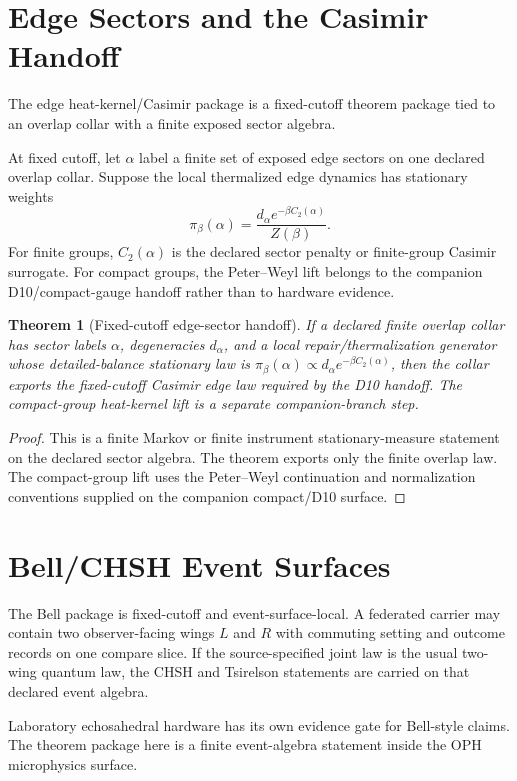 \documentclass[11pt]{article}
\newtheorem{theorem}{Theorem}[section]
\theoremstyle{remark}
\theoremstyle{plain}
\begin{document}
\section{Edge Sectors and the Casimir Handoff}

The edge heat-kernel/Casimir package is a fixed-cutoff theorem package tied to an overlap
collar with a finite exposed sector algebra.

At fixed cutoff, let \(\alpha\) label a finite set of exposed edge sectors on one declared
overlap collar. Suppose the local thermalized edge dynamics has stationary weights
\[
\pi_\beta(\alpha)=\frac{d_\alpha e^{-\beta C_2(\alpha)}}{Z(\beta)}.
\]
For finite groups, \(C_2(\alpha)\) is the declared sector penalty or finite-group Casimir
surrogate. For compact groups, the Peter--Weyl lift belongs to the companion D10/compact-gauge
handoff rather than to hardware evidence.

\begin{theorem}[Fixed-cutoff edge-sector handoff]
If a declared finite overlap collar has sector labels \(\alpha\), degeneracies \(d_\alpha\), and
a local repair/thermalization generator whose detailed-balance stationary law is
\(\pi_\beta(\alpha)\propto d_\alpha e^{-\beta C_2(\alpha)}\), then the collar exports the
fixed-cutoff Casimir edge law required by the D10 handoff. The compact-group heat-kernel lift is a
separate companion-branch step.
\end{theorem}

\begin{proof}
This is a finite Markov or finite instrument stationary-measure statement on the declared sector
algebra. The theorem exports only the finite overlap law. The compact-group lift uses the
Peter--Weyl continuation and normalization conventions supplied on the companion compact/D10
surface.
\end{proof}

\section{Bell/CHSH Event Surfaces}

The Bell package is fixed-cutoff and event-surface-local. A federated carrier may contain two
observer-facing wings \(L\) and \(R\)
with commuting setting and outcome records on one compare slice. If the source-specified joint
law is the usual two-wing quantum law, the CHSH and Tsirelson statements are carried on that
declared event algebra.

Laboratory echosahedral hardware has its own evidence gate for Bell-style claims. The theorem
package here is a finite event-algebra statement inside the OPH microphysics surface.
\end{document}
